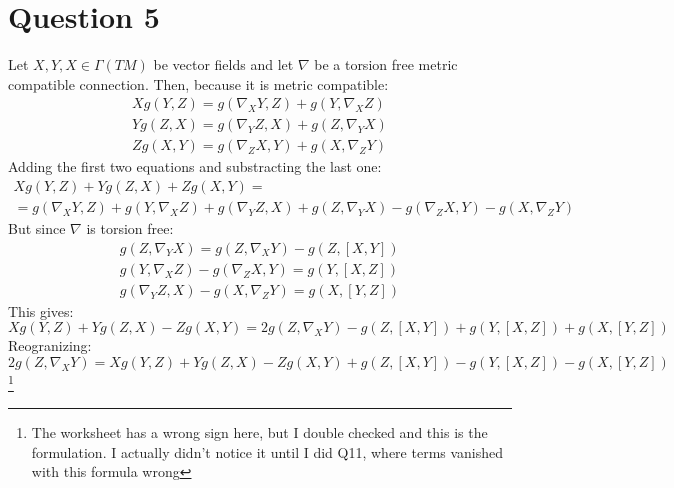 \documentclass{article}
\begin{document}
\section*{Question 5}
Let $X, Y, X \in \Gamma(TM)$ be vector fields and let $\nabla$ be a torsion free metric compatible connection. Then, because it is metric compatible:
\begin{equation}
\begin{gathered}
    X g(Y,Z) = g(\nabla_X Y, Z) + g(Y, \nabla_X Z)
    \\
    Y g(Z,X) = g(\nabla_Y Z, X) + g(Z, \nabla_Y X)
    \\
    Z g(X,Y) = g(\nabla_Z X, Y) + g(X, \nabla_Z Y)
\end{gathered}
\end{equation}
Adding the first two equations and substracting the last one:
\begin{equation}
\begin{gathered}
    X g(Y,Z) + Y g(Z,X) + Z g(X,Y) = \\ =
    g(\nabla_X Y, Z) + g(Y, \nabla_X Z) + g(\nabla_Y Z, X) + g(Z, \nabla_Y X) - g(\nabla_Z X, Y) - g(X, \nabla_Z Y)
\end{gathered}
\end{equation}
But since $\nabla$ is torsion free:
\begin{equation}
\begin{gathered}
    g(Z, \nabla_Y X) = g(Z, \nabla_X Y) - g(Z, [X, Y])
    \\
    g(Y, \nabla_X Z) - g(\nabla_Z X, Y) = g(Y, [X, Z])
    \\
    g(\nabla_Y Z, X) - g(X, \nabla_Z Y) = g(X, [Y, Z])
\end{gathered}
\end{equation}
This gives:
\begin{equation}
    X g(Y,Z) + Y g(Z,X) - Z g(X,Y) = 2g(Z, \nabla_X Y) - g(Z, [X, Y]) + g(Y, [X, Z]) + g(X, [Y, Z])
\end{equation}
Reogranizing:
\begin{equation}
    2g(Z, \nabla_X Y) = X g(Y,Z) + Y g(Z,X) - Z g(X,Y) + g(Z, [X, Y]) - g(Y, [X, Z]) - g(X, [Y, Z])
\end{equation}\footnote{The worksheet has a wrong sign here, but I double checked and this is the formulation. I actually didn't notice it until I did Q11, where terms vanished with this formula wrong}
\end{document}
